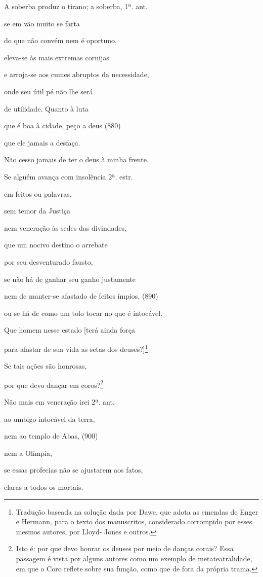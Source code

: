 A soberba produz o tirano; a soberba, 1ª. ant.

se em vão muito se farta

do que não convém nem é oportuno,

eleva-se às mais extremas cornijas

e arroja-se aos cumes abruptos da necessidade,

onde seu útil pé não lhe será

de utilidade. Quanto à luta

que é boa à cidade, peço a deus (880)

que ele jamais a desfaça.

Não cesso jamais de ter o deus à minha frente.

Se alguém avança com insolência 2ª. estr.

em feitos ou palavras,

sem temor da Justiça

nem veneração às sedes das divindades,

que um nocivo destino o arrebate

por seu desventurado fausto,

se não há de ganhar seu ganho justamente

nem de manter-se afastado de feitos ímpios, (890)

ou se há de como um tolo tocar no que é intocável.

Que homem nesse estado {[}terá ainda força

para afastar de sua vida as setas dos deuses?{]}\footnote{Tradução
  baseada na solução dada por Dawe, que adota as emendas de Enger e
  Hermann, para o texto dos manuscritos, considerado corrompido por
  esses mesmos autores, por Lloyd- Jones e outros.}

Se tais ações são honrosas,

por que devo dançar em coros?\footnote{Isto é: por que devo honrar os
  deuses por meio de danças corais? Essa passagem é vista por alguns
  autores como um exemplo de metateatralidade, em que o Coro reflete
  sobre sua função, como que de fora da própria trama.}

Não mais em veneração irei 2ª. ant.

ao umbigo intocável da terra,

nem ao templo de Abas, (900)

nem a Olímpia,

se essas profecias não se ajustarem aos fatos,

claras a todos os mortais.

